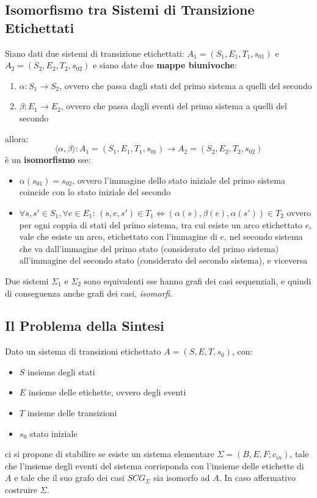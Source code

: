 \subsection{Isomorfismo tra Sistemi di Transizione Etichettati}
Siano dati due sistemi di transizione etichettati:  $A_1 = (S_1,E_1,T_1,s_{01})$ e $A_2 = (S_2 , E_2 , T_2 , s_{02})$ e siano date due \textbf{mappe biunivoche}:
\begin{enumerate}
    \item $\alpha:S_1\to S_2$, ovvero che passa dagli stati del primo sistema a quelli del secondo
    \item $\beta:E_1\to E_2$, ovvero che passa dagli eventi del primo sistema a quelli del secondo
\end{enumerate}
  allora: \[\langle \alpha,\beta\rangle:A_1= (S_1 , E_1 , T_1 ,s_{01})\to A_2 = (S_2 ,E_2 , T_2 , s_{02})\] è un \textbf{isomorfismo} sse:
\begin{itemize}
    \item $\alpha(s_{01})=s_{02}$, ovvero l'immagine dello stato iniziale del primo sistema coincide con lo stato iniziale del secondo
    \item $\forall s,s'\in S_1,\forall e\in E_1:\,(s,e,s')\in T_1 \Leftrightarrow (\alpha(s),\beta(e),\alpha(s'))\in T_2$ ovvero per ogni coppia di stati del primo sistema, tra cui esiste un arco etichettato $e$, vale che esiste un arco, etichettato con l'immagine di $e$, nel secondo sistema che va dall'immagine del primo stato (considerato del primo sistema) all'immagine del secondo stato (considerato del secondo sistema), e viceversa
  \end{itemize}
  
Due sistemi $\Sigma_1$ e $\Sigma_2$ sono equivalenti  sse hanno grafi dei casi sequenziali, e quindi di conseguenza anche grafi dei casi, \emph{isomorfi}.\\

\subsection{Il Problema della Sintesi}
Dato un sistema di transizioni etichettato $A=(S,E,T,s_0)$, con: 
\begin{itemize}
  \item $S$ insieme degli stati
  \item $E$ insieme delle etichette, ovvero degli eventi
  \item $T$ insieme delle transizioni
  \item $s_0$ stato iniziale
\end{itemize}
ci si propone di stabilire se esiste un sistema elementare $\Sigma=(B,E,F;c_{in})$, tale che l'insieme degli eventi del sistema corrisponda con l'insieme delle etichette di $A$ e tale che il suo grafo dei casi $SCG_\Sigma$ sia isomorfo ad $A$. In caso affermativo costruire $\Sigma$.\\ 

